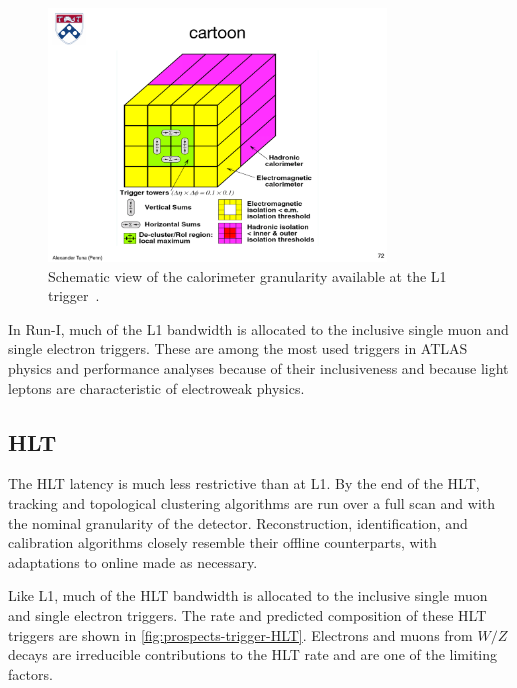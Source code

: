 \begin{figure}[tp]
  \centering
  \includegraphics[width=0.80\textwidth]{figures/trigger/cartoonL1}
  \caption{Schematic view of the calorimeter granularity available at the L1 trigger~\cite{1998.ATLAS-TDR-L1}.}
  \label{fig:prospects-trigger-cartoonL1}
\end{figure}

In Run-I, much of the L1 bandwidth is allocated to the inclusive single muon and single electron triggers. These are among the most used triggers in ATLAS physics and performance analyses because of their inclusiveness and because light leptons are characteristic of electroweak physics.

\subsection{HLT}

The HLT latency is much less restrictive than at L1. By the end of the HLT, tracking and topological clustering algorithms are run over a full scan and with the nominal granularity of the detector. Reconstruction, identification, and calibration algorithms closely resemble their offline counterparts, with adaptations to online made as necessary. 

Like L1, much of the HLT bandwidth is allocated to the inclusive single muon and single electron triggers. The rate and predicted composition of these HLT triggers are shown in \cref{fig:prospects-trigger-HLT}. Electrons and muons from $W/Z$ decays are irreducible contributions to the HLT rate and are one of the limiting factors.

